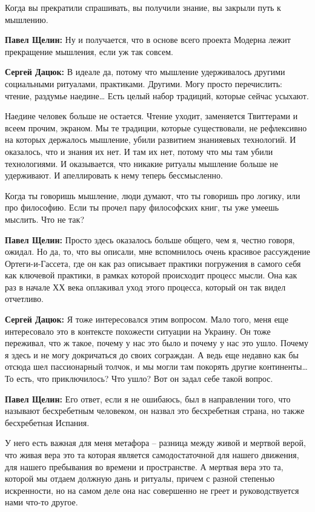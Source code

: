 Когда вы прекратили спрашивать, вы получили знание, вы закрыли путь к мышлению.

\textbf{Павел Щелин:} Ну и получается, что в основе всего проекта Модерна лежит
прекращение мышления, если уж так совсем.

\textbf{Сергей Дацюк:} В идеале да, потому что мышление удерживалось другими социальными
ритуалами, практиками. Другими. Могу просто перечислить: чтение, раздумье
наедине… Есть целый набор традиций, которые сейчас усыхают.

Наедине человек больше не остается. Чтение уходит, заменяется Твиттерами и
всеем прочим, экраном. Мы те традиции, которые существовали, не рефлексивно на
которых держалось мышление, убили развитием знанияевых технологий. И оказалось,
что и знания их нет. И там их нет, потому что мы там убили технологиями. И
оказывается, что никакие ритуалы мышление больше не удерживают. И апеллировать
к нему теперь бессмысленно.

Когда ты говоришь мышление, люди думают, что ты говоришь про логику, или про
философию. Если ты прочел пару философских книг, ты уже умеешь мыслить. Что не
так?

\textbf{Павел Щелин:} Просто здесь оказалось больше общего, чем я, честно говоря,
ожидал. Но да, то, что вы описали, мне вспомнилось очень красивое рассуждение
Ортеги-и-Гассета, где он как раз описывает практики погружения в самого себя
как ключевой практики, в рамках которой происходит процесс мысли. Она как раз в
начале ХХ века оплакивал уход этого процесса, который он так видел отчетливо.

\textbf{Сергей Дацюк:} Я тоже интересовался этим вопросом. Мало того, меня еще
интересовало это в контексте похожести ситуации на Украину. Он тоже переживал,
что ж такое, почему у нас это было и почему у нас это ушло. Почему я здесь и не
могу докричаться до своих сограждан. А ведь еще недавно как бы отсюда шел
пассионарный толчок, и мы могли там покорять другие континенты… То есть, что
приключилось? Что ушло? Вот он задал себе такой вопрос.

\textbf{Павел Щелин:} Его ответ, если я не ошибаюсь, был в направлении того, что
называют бесхребетным человеком, он назвал это бесхребетная страна, но также
бесхребетная Испания.

У него есть важная для меня метафора – разница между живой и мертвой верой, что
живая вера это та которая является самодостаточной для нашего движения, для
нашего пребывания во времени и пространстве. А мертвая вера это та, которой мы
отдаем должную дань и ритуалы, причем с разной степенью искренности, но на
самом деле она нас совершенно не греет и руководствуется нами что-то другое.

